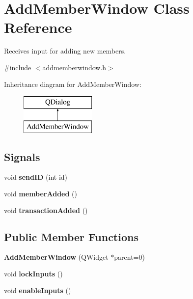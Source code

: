 \hypertarget{class_add_member_window}{}\section{Add\+Member\+Window Class Reference}
\label{class_add_member_window}


Receives input for adding new members.  




{\ttfamily \#include $<$addmemberwindow.\+h$>$}

Inheritance diagram for Add\+Member\+Window\+:\begin{figure}[H]
\begin{center}
\leavevmode
\includegraphics[height=2.000000cm]{class_add_member_window}
\end{center}
\end{figure}
\subsection*{Signals}
\begin{DoxyCompactItemize}
\item 
\mbox{\label{class_add_member_window_af22f84c3e7d64690bb306918bc4b6607}} 
void {\bfseries send\+ID} (int id)
\item 
\mbox{\label{class_add_member_window_ac1837b904952bd90aadcc19553429d55}} 
void {\bfseries member\+Added} ()
\item 
\mbox{\label{class_add_member_window_ab32dbbff91481a5fb84797be209de4a1}} 
void {\bfseries transaction\+Added} ()
\end{DoxyCompactItemize}
\subsection*{Public Member Functions}
\begin{DoxyCompactItemize}
\item 
\mbox{\label{class_add_member_window_a849e43bc02f9d4f8c653836ddb6ffc49}} 
{\bfseries Add\+Member\+Window} (Q\+Widget $\ast$parent=0)
\item 
\mbox{\label{class_add_member_window_a4633f09d41fd29df4ba2dffb8d27f923}} 
void {\bfseries lock\+Inputs} ()
\item 
\mbox{\label{class_add_member_window_a8cf90e1e7b2345147c0622a6188d9de3}} 
void {\bfseries enable\+Inputs} ()
\end{DoxyCompactItemize}
